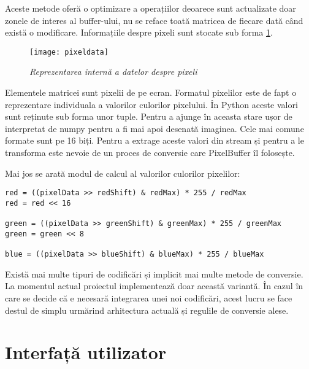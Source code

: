 Aceste metode oferă o optimizare a operațiilor deoarece sunt actualizate doar zonele de interes al buffer-ului, nu se reface toată matricea de fiecare dată când există o modificare. Informațiile despre pixeli sunt stocate sub forma \ref{pixdata}.
 
\begin{figure}
    \centering
    \texttt{[image: pixeldata]}
    \caption{\textit{Reprezentarea internă a datelor despre pixeli}}
    \label{pixdata}
\end{figure}

Elementele matricei sunt pixelii de pe ecran. Formatul pixelilor este de fapt o reprezentare individuala a valorilor culorilor pixelului. În Python aceste valori sunt reținute sub forma unor tuple. Pentru a ajunge în aceasta stare ușor de interpretat de numpy pentru a fi mai apoi desenată imaginea. Cele mai comune formate sunt pe 16 biți. Pentru a extrage aceste valori din stream și pentru a le transforma este nevoie de un proces de conversie care PixelBuffer îl folosește.

Mai jos se arată modul de calcul al valorilor culorilor pixelilor:
\lstset{language=C,frame=single, showstringspaces=false}
\begin{lstlisting}
red = ((pixelData >> redShift) & redMax) * 255 / redMax
red = red << 16
  
green = ((pixelData >> greenShift) & greenMax) * 255 / greenMax
green = green << 8
  
blue = ((pixelData >> blueShift) & blueMax) * 255 / blueMax
\end{lstlisting}

Există mai multe tipuri de codificări și implicit mai multe metode de conversie. La momentul actual proiectul implementează doar această variantă. În cazul în care se decide că e necesară integrarea unei noi codificări, acest lucru se face destul de simplu urmărind arhitectura actuală și regulile de conversie alese.





\section{Interfață utilizator}


